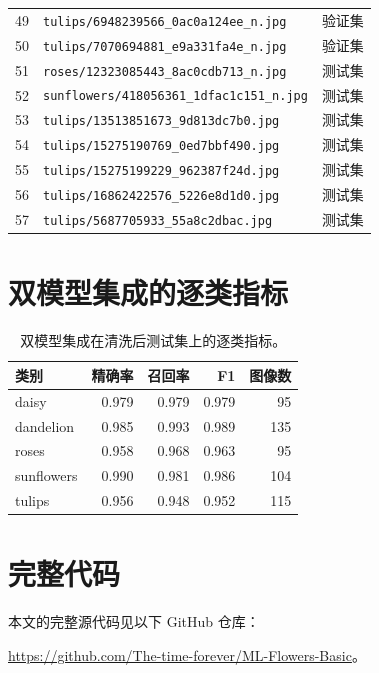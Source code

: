 \documentclass[11pt,a4paper,UTF8,fontset=windows]{ctexart}
\begin{document}
\begin{longtable}{rll}
49 & \texttt{tulips/6948239566\_0ac0a124ee\_n.jpg} & 验证集 \\
50 & \texttt{tulips/7070694881\_e9a331fa4e\_n.jpg} & 验证集 \\
51 & \texttt{roses/12323085443\_8ac0cdb713\_n.jpg} & 测试集 \\
52 & \texttt{sunflowers/418056361\_1dfac1c151\_n.jpg} & 测试集 \\
53 & \texttt{tulips/13513851673\_9d813dc7b0.jpg} & 测试集 \\
54 & \texttt{tulips/15275190769\_0ed7bbf490.jpg} & 测试集 \\
55 & \texttt{tulips/15275199229\_962387f24d.jpg} & 测试集 \\
56 & \texttt{tulips/16862422576\_5226e8d1d0.jpg} & 测试集 \\
57 & \texttt{tulips/5687705933\_55a8c2dbac.jpg} & 测试集 \\
\end{longtable}

\section{双模型集成的逐类指标}
\label{app:per-class}


\begin{table}[H]
\centering
\small
\caption{双模型集成在清洗后测试集上的逐类指标。}
\label{tab:final}
\begin{tabular}{lrrrr}
\toprule
类别 & 精确率 & 召回率 & F1 & 图像数 \\
\midrule
daisy      & 0.979 & 0.979 & 0.979 & 95 \\
dandelion  & 0.985 & 0.993 & 0.989 & 135 \\
roses      & 0.958 & 0.968 & 0.963 & 95 \\
sunflowers & 0.990 & 0.981 & 0.986 & 104 \\
tulips     & 0.956 & 0.948 & 0.952 & 115 \\
\bottomrule
\end{tabular}

\end{table}

\section{完整代码}
\label{app:code}

本文的完整源代码见以下 GitHub 仓库：

\url{https://github.com/The-time-forever/ML-Flowers-Basic}。
\end{document}

